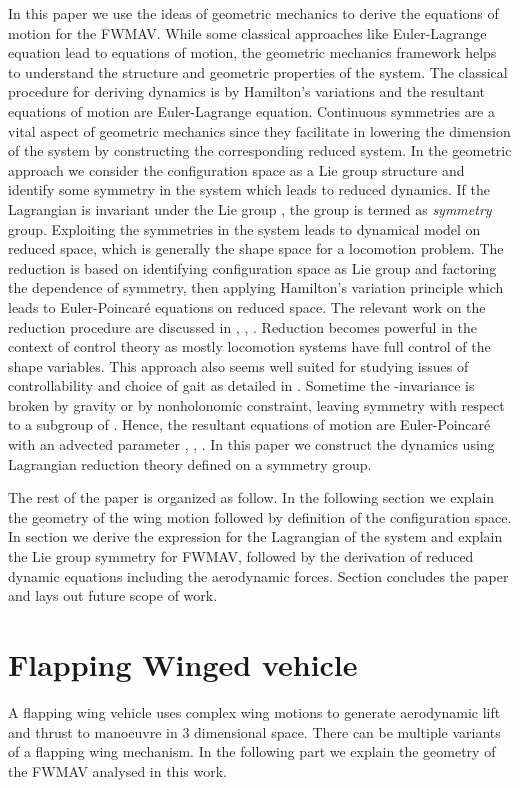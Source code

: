 \documentclass[letterpaper, 10 pt, conference]{ieeeconf}  \newcommand{\RN}[1]{\textup{\uppercase\expandafter{\romannumeral#1}}}
\begin{document}
In this paper we use the ideas of geometric mechanics to derive the equations of motion for the FWMAV. While some classical approaches like Euler-Lagrange equation lead to equations of motion, the geometric mechanics framework helps to understand the structure and geometric properties of the system. The classical procedure for deriving dynamics is by Hamilton's variations and the resultant equations of motion are Euler-Lagrange equation. Continuous symmetries are a vital aspect of geometric mechanics since they facilitate in lowering the dimension of the system by constructing the corresponding reduced system. In the geometric approach we consider the configuration space as a Lie group structure and identify some symmetry in the system which leads to reduced dynamics. If the Lagrangian is invariant under the Lie group , the group is termed as \textit{symmetry} group. Exploiting the symmetries in the system leads to dynamical model on reduced space, which is generally the shape space for a locomotion problem. The reduction is based on identifying configuration space as Lie group and factoring the dependence of symmetry, then applying Hamilton's variation principle which leads to Euler-Poincar\'{e} equations on reduced space. The relevant work on the reduction procedure are discussed in \cite{marsden_krishna_bloch}, \cite{ostrowski}, \cite{cendra}. Reduction becomes powerful in the context of control theory as mostly locomotion systems have full control of the shape variables. This approach also seems well suited for studying issues of controllability and choice of gait as detailed in \cite{kelly murray}. Sometime the -invariance is broken by gravity or by nonholonomic constraint, leaving symmetry with respect to a subgroup of . Hence, the resultant equations of motion are Euler-Poincar\'{e} with an advected parameter \cite{cendra}, \cite{holm}, \cite{gajbhiye_banavar}. In this paper we construct the dynamics using Lagrangian reduction theory defined on a symmetry group. 


The rest of the paper is organized as follow. In the following section we explain the geometry of the wing motion followed by definition of the configuration space. In section  we derive the expression for the Lagrangian of the system and explain the Lie group symmetry for FWMAV, followed by the derivation of reduced dynamic equations including the aerodynamic forces. Section  concludes the paper and lays out future scope of work.

\section{Flapping Winged vehicle}
A flapping wing vehicle uses complex wing motions to generate aerodynamic lift and thrust to manoeuvre in 3 dimensional space. There can be multiple variants of a  flapping wing mechanism. In the following part we explain the geometry of the FWMAV analysed in this work.
\end{document}
